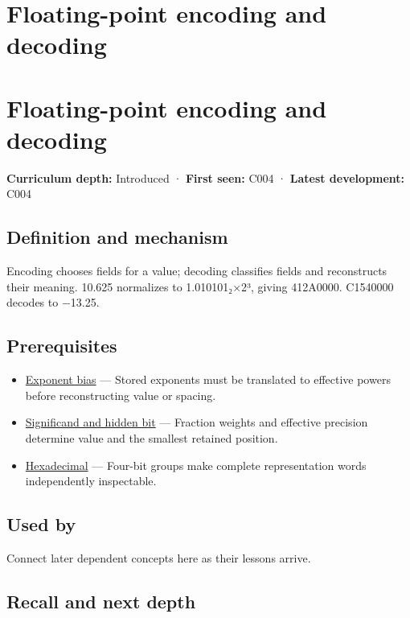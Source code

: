 \hypertarget{appendix-6854d0e2218e}{}
\section*{Floating-point encoding and decoding}
\section{Floating-point encoding and decoding}\label{floating-point-encoding-and-decoding}

\textbf{Curriculum depth:} Introduced · \textbf{First seen:} C004 · \textbf{Latest development:} C004

\subsection{Definition and mechanism}\label{definition-and-mechanism}

Encoding chooses fields for a value; decoding classifies fields and reconstructs their meaning. 10.625 normalizes to 1.010101₂×2³, giving 412A0000. C1540000 decodes to −13.25.

\subsection{Prerequisites}\label{prerequisites}

\begin{itemize}
\tightlist
\item
  \hyperref[appendix-2fae058c82e1]{Exponent bias} --- Stored exponents must be translated to effective powers before reconstructing value or spacing.
\item
  \hyperref[appendix-a24fd710cf67]{Significand and hidden bit} --- Fraction weights and effective precision determine value and the smallest retained position.
\item
  \hyperref[appendix-6b8075763724]{Hexadecimal} --- Four-bit groups make complete representation words independently inspectable.
\end{itemize}

\subsection{Used by}\label{used-by}

Connect later dependent concepts here as their lessons arrive.

\subsection{Recall and next depth}\label{recall-and-next-depth}

